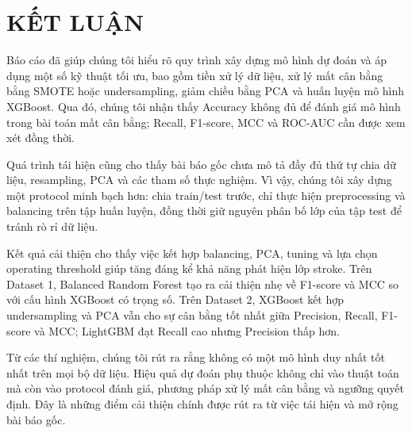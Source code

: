 \chapter*{KẾT LUẬN}

Báo cáo đã giúp chúng tôi hiểu rõ quy trình xây dựng mô hình dự đoán
và áp dụng một số kỹ thuật tối ưu, bao gồm tiền xử lý dữ liệu, xử lý mất cân
bằng bằng SMOTE hoặc undersampling, giảm chiều bằng PCA và huấn luyện
mô hình XGBoost. Qua đó, chúng tôi nhận thấy Accuracy không đủ để đánh
giá mô hình trong bài toán mất cân bằng; Recall, F1-score, MCC và
ROC-AUC cần được xem xét đồng thời.

Quá trình tái hiện cũng cho thấy bài báo gốc chưa mô tả đầy đủ thứ tự
chia dữ liệu, resampling, PCA và các tham số thực nghiệm. Vì vậy,
chúng tôi xây dựng một protocol minh bạch hơn: chia train/test trước,
chỉ thực hiện preprocessing và balancing trên tập huấn luyện, đồng thời
giữ nguyên phân bố lớp của tập test để tránh rò rỉ dữ liệu.

Kết quả cải thiện cho thấy việc kết hợp balancing, PCA, tuning và lựa
chọn operating threshold giúp tăng đáng kể khả năng phát hiện lớp
stroke. Trên Dataset 1, Balanced Random Forest tạo ra cải thiện nhẹ về
F1-score và MCC so với cấu hình XGBoost có trọng số. Trên Dataset 2,
XGBoost kết hợp undersampling và PCA vẫn cho sự cân bằng tốt nhất giữa
Precision, Recall, F1-score và MCC; LightGBM đạt Recall cao nhưng
Precision thấp hơn.

Từ các thí nghiệm, chúng tôi rút ra rằng không có một mô hình duy nhất
tốt nhất trên mọi bộ dữ liệu. Hiệu quả dự đoán phụ thuộc không chỉ vào
thuật toán mà còn vào protocol đánh giá, phương pháp xử lý mất cân bằng
và ngưỡng quyết định. Đây là những điểm cải thiện chính được rút ra từ
việc tái hiện và mở rộng bài báo gốc.